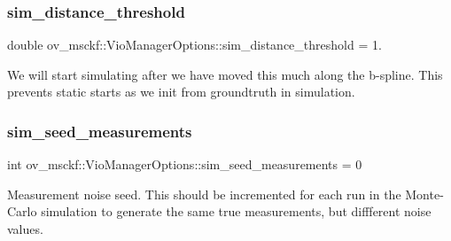 \subsubsection{\texorpdfstring{sim\+\_\+distance\+\_\+threshold}{sim\_distance\_threshold}}
{\footnotesize\ttfamily double ov\+\_\+msckf\+::\+Vio\+Manager\+Options\+::sim\+\_\+distance\+\_\+threshold = 1.}

We will start simulating after we have moved this much along the b-\/spline. This prevents static starts as we init from groundtruth in simulation. \mbox{\label{structov__msckf_1_1VioManagerOptions_a9b3fee122a7d3b2069a424b5ef1b1155}} 
\subsubsection{\texorpdfstring{sim\+\_\+seed\+\_\+measurements}{sim\_seed\_measurements}}
{\footnotesize\ttfamily int ov\+\_\+msckf\+::\+Vio\+Manager\+Options\+::sim\+\_\+seed\+\_\+measurements = 0}

Measurement noise seed. This should be incremented for each run in the Monte-\/\+Carlo simulation to generate the same true measurements, but diffferent noise values. 